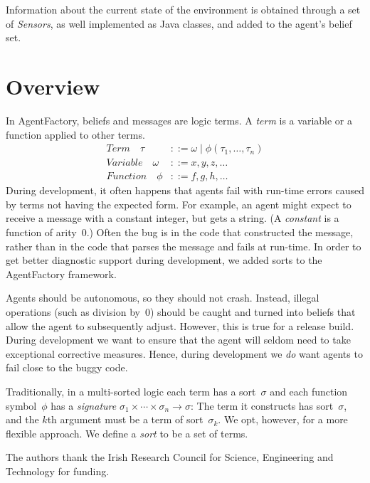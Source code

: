 \documentclass[preprint]{sigplanconf} %
\begin{document}
Information about the current state of the environment is obtained through
a set of \textit{Sensors}, as well implemented as Java classes, and added
to the agent's belief set.
\section{Overview} %

In AgentFactory, beliefs and messages are logic terms. A \emph{term} is a
variable or a function applied to other terms.
\begin{align}
\mathit{Term}\quad\tau
  &::= \omega
  \mid \phi(\tau_1,\ldots,\tau_n) \\
\mathit{Variable}\quad\omega
  &::= x, y, z, \ldots \\
\mathit{Function}\quad\phi
  &::= f, g, h, \ldots
\end{align}
During development, it often happens that agents fail with run-time errors
caused by terms not having the expected form. For example, an agent might
expect to receive a message with a constant integer, but gets a string.  (A
\emph{constant} is a function of arity~$0$.) Often the bug is in the code
that constructed the message, rather than in the code that parses the
message and fails at run-time. In order to get better diagnostic support
during development, we added sorts to the AgentFactory framework.

Agents should be autonomous, so they should not crash. Instead, illegal
operations (such as division by~$0$) should be caught and turned into
beliefs that allow the agent to subsequently adjust. However, this is true
for a release build. During development we want to ensure that the agent
will seldom need to take exceptional corrective measures. Hence, during
development we \emph{do} want agents to fail close to the buggy code.

Traditionally, in a multi-sorted logic each term has a sort~$\sigma$ and
each function symbol~$\phi$ has a \emph{signature}
$\sigma_1\times\cdots\times\sigma_n\to\sigma$: The term it constructs has
sort~$\sigma$, and the $k$th argument must be a term of sort~$\sigma_k$. We
opt, however, for a more flexible approach. We define a \emph{sort} to be a
set of terms.

\acks

The authors thank the Irish Research Council for Science, Engineering and
Technology for funding.




\end{document}
